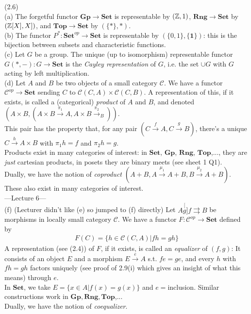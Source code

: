\documentclass[a4paper]{article}
\begin{document}
\begin{eg} (2.6)\\
    (a) The forgetful functor $\mathbf{Gp} \to \mathbf{Set}$ is representable by $(\mathbb{Z},1)$, $\mathbf{Rng} \to \mathbf{Set}$ by $(\mathbb{Z}[X],X])$, and $\mathbf{Top} \to \mathbf{Set}$ by $(\{*\},*)$.\\
    (b) The functor $P^*: \mathbf{Set}^{op} \to \mathbf{Set}$ is representable by $(\{0,1\},\{\mathbf{1}\})$: this is the bijection between subsets and characteristic functions.\\
    (c) Let $G$ be a group. The unique (up to isomorphism) representable functor $G(*,-): G \to \mathbf{Set}$ is the \emph{Cayley representation} of $G$, i.e. the set $\cup G$ with $G$ acting by left multiplication.\\
    (d) Let $A$ and $B$ be two objects of a small category $\mathcal{C}$. We have a functor $\mathcal{C}^{op} \to \mathbf{Set}$ sending $C$ to $\mathcal{C}(C,A) \times \mathcal{C}(C,B)$. A representation of this, if it exists, is called a (categorical) \emph{product} of $A$ and $B$, and denoted $(A \times B,(A \times B \xrightarrow{\pi_1} A, A \times B \xrightarrow{\pi_2}_B))$.\\
    This pair has the property that, for any pair $(C \xrightarrow{f}A,C\xrightarrow{g}B)$, there's a unique $C \xrightarrow{h} A \times B$ with $\pi_1 h = f$ and $\pi_2 h = g$.\\
    Products exist in many categories of interest: in $\mathbf{Set}$, $\mathbf{Gp}$, $\mathbf{Rng}$, $\mathbf{Top}$,..., they are \emph{just} cartesian products, in posets they are binary meets (see sheet 1 Q1).\\
    Dually, we have the notion of \emph{coproduct} $(A+B,A \xrightarrow{\mu_1} A + B, B \xrightarrow{\mu_2}A+B)$.\\
    These also exist in many categories of interest.\\
    ---Lecture 6---\\
    (f) (Lecturer didn't like (e) so jumped to (f) directly) Let $A \stackrel[g]{f}{\rightrightarrows} B$ be morphisms in locally small category $\mathcal{C}$. We have a functor $F:\mathcal{C}^{op} \to \mathbf{Set}$ defined by 
    \begin{equation*}
        \begin{aligned}
            F(C) = \{h \in \mathcal{C}(C,A) | fh = gh\}
        \end{aligned}
    \end{equation*}
    A representation (see (2.4)) of $F$, if it exists, is called an \emph{equalizer} of $(f,g)$: It consists of an object $E$ and a morphism $E \xrightarrow{e} A$ s.t. $fe=ge$, and every $h$ with $fh=gh$ factors uniquely (see proof of 2.9(i) which gives an insight of what this means) through $e$.\\
    In $\mathbf{Set}$, we take $E = \{x \in A | f(x) = g(x) \}$ and $e=$inclusion. Similar constructions work in $\mathbf{Gp},\mathbf{Rng},\mathbf{Top}$,...\\
    Dually, we have the notion of \emph{coequalizer}.
\end{eg}
\end{document}
